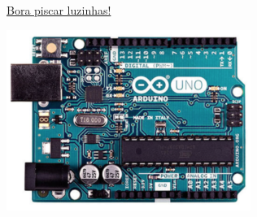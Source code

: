 
{\huge \href{http://eletronicaparaartistas.com.br/arduino-1-introducao/}{	\Large Bora piscar luzinhas!}
}

\begin{center}
	\includegraphics[width=.7\linewidth]{./IMG/Arduino-Uno.png}
\end{center}

\vfill\null
\columnbreak
